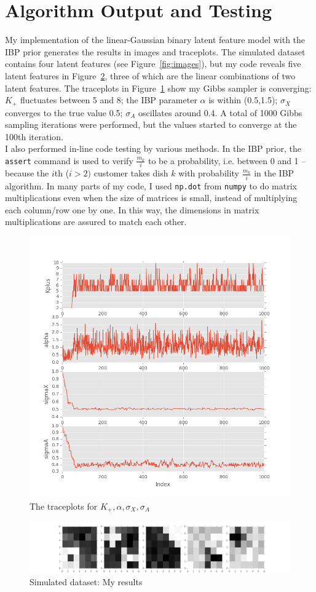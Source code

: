 \section{Algorithm Output and Testing}
My implementation of the linear-Gaussian binary latent feature model with the IBP prior generates the results in images and traceplots. The simulated dataset contains four latent features (see Figure~\ref{fig:images}), but my code reveals five latent features in Figure~\ref{fig:imageresults}, three of which are the linear combinations of two latent features. The traceplots in Figure~\ref{fig:plotresults} show my Gibbs sampler is converging: $K_+$ fluctuates between 5 and 8; the IBP parameter $\alpha$ is within (0.5,1.5); $\sigma_X$ converges to the true value 0.5; $\sigma_A$ oscillates around 0.4. A total of 1000 Gibbs sampling iterations were performed, but the values started to converge at the 100th iteration.\\

I also performed in-line code testing by various methods. In the IBP prior, the \texttt{assert} command is used to verify $\frac{m_k}{i}$ to be a probability, i.e. between 0 and 1 -- because the $i$th ($i > 2)$ customer takes dish $k$ with probability $\frac{m_k}{i}$ in the IBP algorithm. In many parts of my code, I used \texttt{np.dot} from \texttt{numpy} to do matrix multiplications even when the size of matrices is small, instead of multiplying each column/row one by one. In this way, the dimensions in matrix multiplications are assured to match each other.

\begin{figure}[!ht]
\centering
    \includegraphics[width=0.65\linewidth]{IBP_plot_results.png}
    \vspace{-20pt}
    \caption{The traceplots for $K_+, \alpha, \sigma_X, \sigma_A$}
    \label{fig:plotresults}
\end{figure}

\begin{figure}[!ht]
\centering
    \includegraphics[width=\linewidth]{IBP_image_results.png}
    \caption{Simulated dataset: My results}
    \label{fig:imageresults}
\end{figure}